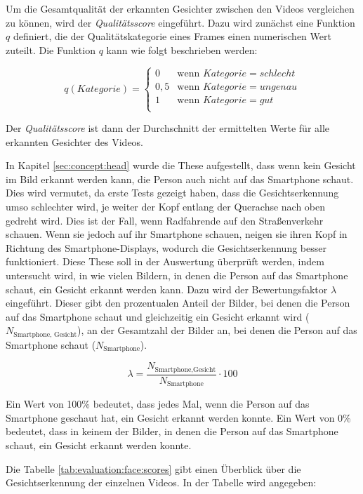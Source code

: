 Um die Gesamtqualität der erkannten Gesichter zwischen den Videos vergleichen zu können, wird der \textit{Qualitätsscore} eingeführt. Dazu wird zunächst eine Funktion $q$ definiert, die der Qualitätskategorie eines Frames einen numerischen Wert zuteilt. Die Funktion $q$ kann wie folgt beschrieben werden:

\[
q(Kategorie) = 
\begin{cases} 
0 & \text{wenn } Kategorie = schlecht \\
0,5 & \text{wenn } Kategorie = ungenau \\
1 & \text{wenn } Kategorie = gut \\
\end{cases}
\]

Der \textit{Qualitätsscore} ist dann der Durchschnitt der ermittelten Werte für alle erkannten Gesichter des Videos. 

In Kapitel \ref{sec:concept:head} wurde die These aufgestellt, dass wenn kein Gesicht im Bild erkannt werden kann, die Person auch nicht auf das Smartphone schaut. Dies wird vermutet, da erste Tests gezeigt haben, dass die Gesichtserkennung umso schlechter wird, je weiter der Kopf entlang der Querachse nach oben gedreht wird. Dies ist der Fall, wenn Radfahrende auf den Straßenverkehr schauen. Wenn sie jedoch auf ihr Smartphone schauen, neigen sie ihren Kopf in Richtung des Smartphone-Displays, wodurch die Gesichtserkennung besser funktioniert. Diese These soll in der Auswertung überprüft werden, indem untersucht wird, in wie vielen Bildern, in denen die Person auf das Smartphone schaut, ein Gesicht erkannt werden kann. Dazu wird der Bewertungsfaktor $\lambda$ eingeführt. Dieser gibt den prozentualen Anteil der Bilder, bei denen die Person auf das Smartphone schaut und gleichzeitig ein Gesicht erkannt wird ($N_{\text{Smartphone, Gesicht}}$), an der Gesamtzahl der Bilder an, bei denen die Person auf das Smartphone schaut ($N_{\text{Smartphone}}$). 

\[
\lambda = \frac{N_{\text{Smartphone,Gesicht}}}{N_{\text{Smartphone}}}\cdot 100
\]

Ein Wert von 100\% bedeutet, dass jedes Mal, wenn die Person auf das Smartphone geschaut hat, ein Gesicht erkannt werden konnte. Ein Wert von 0\% bedeutet, dass in keinem der Bilder, in denen die Person auf das Smartphone schaut, ein Gesicht erkannt werden konnte.

Die Tabelle \ref{tab:evaluation:face:scores} gibt einen Überblick über die Gesichtserkennung der einzelnen Videos. In der Tabelle wird angegeben:

